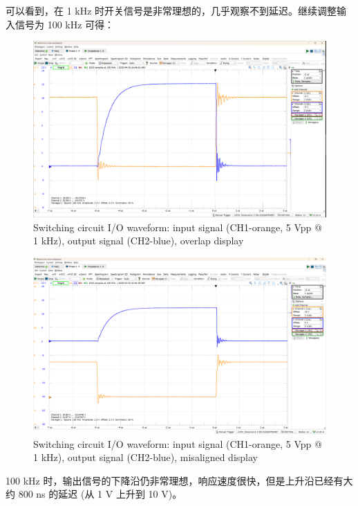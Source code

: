 \documentclass[UTF8]{article}
\begin{document}
可以看到，在 1 kHz 时开关信号是非常理想的，几乎观察不到延迟。继续调整输入信号为 100 kHz 可得：
\begin{figure}[H]\centering
    \includegraphics[width=\columnwidth]{LCE-04-场效应管/assets/switching circuit/开关 input-output 100kHz.png}
    \caption{Switching circuit I/O waveform: input signal (CH1-orange, 5 Vpp @ 1 kHz), output signal (CH2-blue), overlap display}
\end{figure}
\begin{figure}[H]\centering
    \includegraphics[width=\columnwidth]{LCE-04-场效应管/assets/switching circuit/开关 input-output 100kHz (2).png}
    \caption{Switching circuit I/O waveform: input signal (CH1-orange, 5 Vpp @ 1 kHz), output signal (CH2-blue), misaligned display}
\end{figure}

100 kHz 时，输出信号的下降沿仍非常理想，响应速度很快，但是上升沿已经有大约 800 ns 的延迟 (从 1 V 上升到 10 V)。

\end{document}
